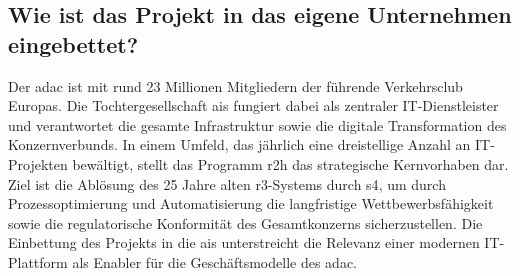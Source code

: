 \subsection{Wie ist das Projekt in das eigene Unternehmen eingebettet?}
\label{subsec:Projekteinbettung}

\par Der \gls{adac} ist mit rund 23 Millionen Mitgliedern der führende Verkehrsclub Europas. Die Tochtergesellschaft \gls{ais} fungiert dabei als zentraler IT-Dienstleister und verantwortet die gesamte Infrastruktur sowie die digitale Transformation des Konzernverbunds. In einem Umfeld, das jährlich eine dreistellige Anzahl an IT-Projekten bewältigt, stellt das Programm \gls{r2h} das strategische Kernvorhaben dar. Ziel ist die Ablösung des 25 Jahre alten \gls{r3}-Systems durch \gls{s4}, um durch Prozessoptimierung und Automatisierung die langfristige Wettbewerbsfähigkeit sowie die regulatorische Konformität des Gesamtkonzerns sicherzustellen. Die Einbettung des Projekts in die \gls{ais} unterstreicht die Relevanz einer modernen IT-Plattform als Enabler für die Geschäftsmodelle des \gls{adac}.


